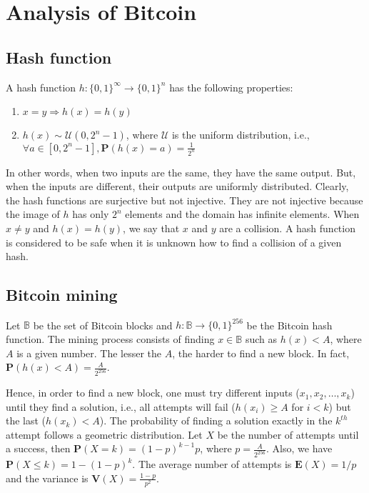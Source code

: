 \chapter{Analysis of Bitcoin}

\section{Hash function}

A hash function $h: \{0, 1\}^\infty \rightarrow \{0, 1\}^{n}$ has the following properties:

\begin{enumerate}
	\item $x = y \Rightarrow h(x) = h(y)$
	\item $h(x) \sim \mathcal{U}(0, 2^{n}-1)$, where $\mathcal{U}$ is the uniform distribution, i.e., $\forall a \in [0, 2^{n}-1], \mathbf{P}(h(x)=a) = \frac{1}{2^{n}}$
\end{enumerate}

In other words, when two inputs are the same, they have the same output. But, when the inputs are different, their outputs are uniformly distributed. Clearly, the hash functions are surjective but not injective. They are not injective because the image of $h$ has only $2^n$ elements and the domain has infinite elements. When $x \ne y$ and $h(x) = h(y)$, we say that $x$ and $y$ are a collision. A hash function is considered to be safe when it is unknown how to find a collision of a given hash.

\section{Bitcoin mining}

Let $\mathbb{B}$ be the set of Bitcoin blocks and $h: \mathbb{B} \rightarrow \{0, 1\}^{256}$ be the Bitcoin hash function. The mining process consists of finding $x \in \mathbb{B}$ such as $h(x) < A$, where $A$ is a given number. The lesser the $A$, the harder to find a new block. In fact, $\mathbf{P}(h(x) < A) = \frac{A}{2^{256}}$.

Hence, in order to find a new block, one must try different inputs ($x_1, x_2, \dots, x_k$) until they find a solution, i.e., all attempts will fail ($h(x_i) \geq A$ for $i < k$) but the last ($h(x_k) < A$). The probability of finding a solution exactly in the $k^{th}$ attempt follows a geometric distribution. Let $X$ be the number of attempts until a success, then $\mathbf{P}(X = k) = (1-p)^{k-1} p$, where $p = \frac{A}{2^{256}}$. Also, we have $\mathbf{P}(X \leq k) = 1 - (1-p)^k$. The average number of attempts is $\mathbf{E}(X) = 1/p$ and the variance is $\mathbf{V}(X) = \frac{1-p}{p^2}$.

